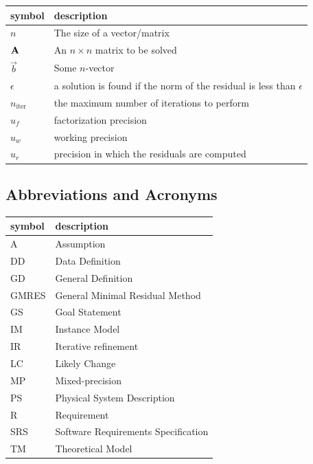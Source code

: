 \documentclass[12pt]{article}
\begin{document}
\renewcommand{\arraystretch}{1.2}
\noindent \begin{longtable*}{l p{12cm}}
  \toprule
  \textbf{symbol}    & \textbf{description} \\
  \midrule
  \(n\)        & The size of a vector/matrix \\
  \(\mathbf{A}\) & An \(n \times n\) matrix to be solved \\
  \(\vec{b}\)        & Some \(n\)-vector \\
  \(\epsilon\)        & a solution is found if the norm of the residual is less than \(\epsilon\) \\
  \(n_\mathrm{iter}\) & the maximum number of iterations to perform \\
  \(u_f\)       & factorization precision \\
  \(u_w\)       & working precision \\
  \(u_r\)       & precision in which the residuals are computed \\
  \bottomrule
\end{longtable*}

\subsection{Abbreviations and Acronyms}

\renewcommand{\arraystretch}{1.2}
\begin{tabular}{l l}
  \toprule
  \textbf{symbol} & \textbf{description} \\
  \midrule
  A         & Assumption \\
  DD        & Data Definition \\
  GD        & General Definition \\
  GMRES     & General Minimal Residual Method \\
  GS        & Goal Statement \\
  IM        & Instance Model \\
  IR        & Iterative refinement \\
  LC        & Likely Change \\
  MP        & Mixed-precision \\
  PS        & Physical System Description \\
  R         & Requirement \\
  SRS       & Software Requirements Specification \\
  TM        & Theoretical Model \\
  \bottomrule
\end{tabular}
\end{document}
